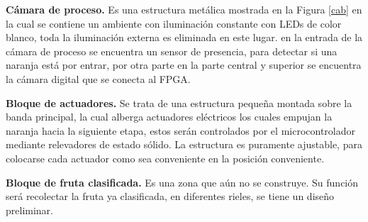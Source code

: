 \documentclass[twoside,spanish,ESP,MSc]{plantillaLabUPV}
\theoremstyle{definition}
\begin{document}

\checkmark\textbf{Cámara de proceso.} Es una estructura metálica mostrada en la Figura \ref{cab} en la cual se contiene un ambiente con iluminación constante con LEDs de color blanco, toda la iluminación externa es eliminada en este lugar. en la entrada de la cámara de proceso se encuentra un sensor de presencia, para detectar si una naranja está por entrar, por otra parte en la parte central y superior se encuentra la cámara digital que se conecta al FPGA.



\checkmark\textbf{Bloque de actuadores.} Se trata de una estructura pequeña montada sobre la banda principal, la cual alberga actuadores eléctricos los cuales empujan la naranja hacia la siguiente etapa, estos serán controlados por el microcontrolador mediante relevadores de estado sólido. La estructura es puramente ajustable, para colocarse cada actuador como sea conveniente en la posición conveniente.



\checkmark\textbf{Bloque de fruta clasificada.} Es una zona que aún no se construye. Su función será recolectar la fruta ya clasificada, en diferentes rieles, se tiene un diseño preliminar.
\end{document}
